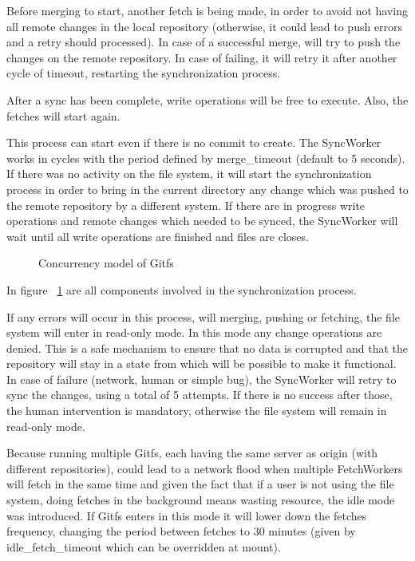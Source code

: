 Before merging to start, another fetch is being made, in order to avoid not having all remote changes in the local repository (otherwise, it could lead to push errors and a retry should processed). In case of a successful merge, will try to push the changes on the remote repository. In case of failing, it will retry it after another cycle of timeout, restarting the synchronization process.

After a sync has been complete, write operations will be free to execute. Also, the fetches will start again.

This process can start even if there is no commit to create. The SyncWorker works in cycles with the period defined by merge\_timeout (default to 5 seconds). If there was no activity on the file system, it will start the synchronization process in order to bring in the current directory any change which was pushed to the remote repository by a different system. If there are in progress write operations and remote changes which needed to be synced, the SyncWorker will wait until all write operations are finished and files are closes.

\begin{figure}[h]
  \begin{center}
    \def\svgwidth{\columnwidth}
    
  \end{center}
  \caption{Concurrency model of Gitfs}
  \label{fig:concurrency}
\end{figure}

In figure ~\ref{fig:concurrency} are all components involved in the synchronization process.

If any errors will occur in this process, will merging, pushing or fetching, the file system will enter in read-only mode. In this mode any change operations are denied. This is a safe mechanism to ensure that no data is corrupted and that the repository will stay in a state from which will be possible to make it functional. In case of failure (network, human or simple bug), the SyncWorker will retry to sync the changes, using a total of 5 attempts. If there is no success after those, the human intervention is mandatory, otherwise the file system will remain in read-only mode.

Because running multiple Gitfs, each having the same server as origin (with different repositories), could lead to a network flood when multiple FetchWorkers will fetch in the same time and given the fact that if a user is not using the file system, doing fetches in the background means wasting resource, the idle mode was introduced. If Gitfs enters in this mode it will lower down the fetches frequency, changing the period between fetches to 30 minutes (given by idle\_fetch\_timeout which can be overridden at mount).

